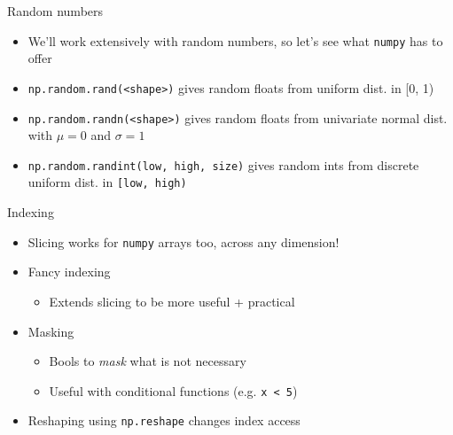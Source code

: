 \documentclass[presentation]{beamer}
\begin{document}
\begin{frame}[label={sec:org7e36254},fragile]{Random numbers}
\begin{itemize}
\item We'll work extensively with random numbers, so let's see what \texttt{numpy} has
to offer
\item \texttt{np.random.rand(<shape>)} gives random floats from uniform dist. in [0, 1)
\item \texttt{np.random.randn(<shape>)} gives random floats from univariate normal
dist. with \(\mu = 0\) and \(\sigma = 1\)
\item \texttt{np.random.randint(low, high, size)} gives random ints from discrete uniform dist.
in \texttt{[low, high)}
\end{itemize}
\end{frame}
\begin{frame}[label={sec:org97334c7},fragile]{Indexing}
\begin{itemize}
\item Slicing works for \texttt{numpy} arrays too, across any dimension!
\item Fancy indexing
\begin{itemize}
\item Extends slicing to be more useful + practical
\end{itemize}
\item Masking
\begin{itemize}
\item Bools to \emph{mask} what is not necessary
\item Useful with conditional functions (e.g. \texttt{x < 5})
\end{itemize}
\item Reshaping using \texttt{np.reshape} changes index access
\end{itemize}
\end{frame}
\end{document}
